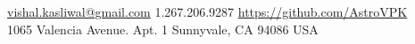 \documentclass[10pt,a4paper]{article}
\begin{document}
\sloppy  %



\nobreakvspace{0.3em}  %

\noindent\href{mailto:vishal.dot.kasliwal.at.gmail.dot.com}{vishal.kasliwal\mbox{}@\mbox{}gmail.com}\sbull
\textsmaller{+}1.267.206.9287\sbull
\href{https://github.com/AstroVPK}{https://github.com/AstroVPK}
\\
1065 Valencia Avenue.\sbull
\thinspace Apt. 1\sbull%
Sunnyvale, CA 94086\sbull
USA

\spacedhrule{2.0em}{0.2em}  %
\end{document}
